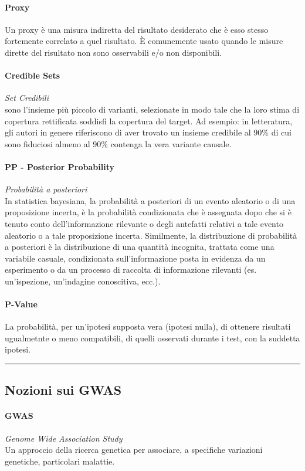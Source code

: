 \documentclass{article}
\begin{document}
\paragraph{Proxy}Un proxy è una misura indiretta del risultato desiderato che è esso stesso fortemente correlato a quel risultato. È comunemente usato quando le misure dirette del risultato non sono osservabili e/o non disponibili.
\paragraph{Credible Sets}\textit{Set Credibili}\\sono l'insieme più piccolo di varianti, selezionate in modo tale che la loro stima di copertura rettificata soddisfi la copertura del target. Ad esempio: in letteratura, gli autori in genere riferiscono di aver trovato un insieme credibile al 90\% di cui sono fiduciosi almeno al 90\% contenga la vera variante causale.
\paragraph{PP - Posterior Probability}\textit{Probabilità a posteriori}\\In statistica bayesiana, la probabilità a posteriori di un evento aleatorio o di una proposizione incerta, è la probabilità condizionata che è assegnata dopo che si è tenuto conto dell'informazione rilevante o degli antefatti relativi a tale evento aleatorio o a tale proposizione incerta. Similmente, la distribuzione di probabilità a posteriori è la distribuzione di una quantità incognita, trattata come una variabile casuale, condizionata sull'informazione posta in evidenza da un esperimento o da un processo di raccolta di informazione rilevanti (es. un'ispezione, un'indagine conoscitiva, ecc.).
\paragraph{P-Value}La probabilità, per un'ipotesi supposta vera (ipotesi nulla), di ottenere risultati ugualmetnte o meno compatibili, di quelli osservati durante i test, con la suddetta ipotesi.
\par\noindent\rule{\textwidth}{0.4pt}
\subsection*{Nozioni sui GWAS}
\paragraph{GWAS}\textit{Genome Wide Association Study}\\Un approccio della ricerca genetica per associare, a specifiche variazioni genetiche, particolari malattie.
\end{document}
